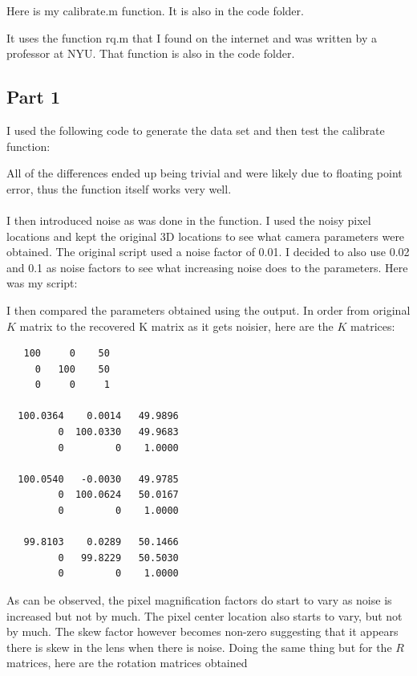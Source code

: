 \documentclass[11pt,psfig]{article}
\begin{document}
Here is my calibrate.m function. It is also in the code folder. 

It uses the function rq.m that I found on the internet and was written by a professor at NYU. That function is also in the code folder.


\subsection*{Part 1}

I used the following code to generate the data set and then test the calibrate function:

All of the differences ended up being trivial and were likely due to floating point error, thus the function itself works very well. \\
\\
I then introduced noise as was done in the function. I used the noisy pixel locations and kept the original 3D locations to see what camera parameters were obtained. The original script used a noise factor of 0.01. I decided to also use 0.02 and 0.1 as noise factors to see what increasing noise does to the parameters. Here was my script:


I then compared the parameters obtained using the output. In order from original $K$ matrix to the recovered K matrix as it gets noisier, here are the $K$ matrices:
\begin{verbatim}
   100     0    50
     0   100    50
     0     0     1

  100.0364    0.0014   49.9896
         0  100.0330   49.9683
         0         0    1.0000

  100.0540   -0.0030   49.9785
         0  100.0624   50.0167
         0         0    1.0000

   99.8103    0.0289   50.1466
         0   99.8229   50.5030
         0         0    1.0000
\end{verbatim}

As can be observed, the pixel magnification factors do start to vary as noise is increased but not by much. The pixel center location also starts to vary, but not by much. The skew factor however becomes non-zero suggesting that it appears there is skew in the lens when there is noise. 
\newpage
Doing the same thing but for the $R$ matrices, here are the rotation matrices obtained
\end{document}
